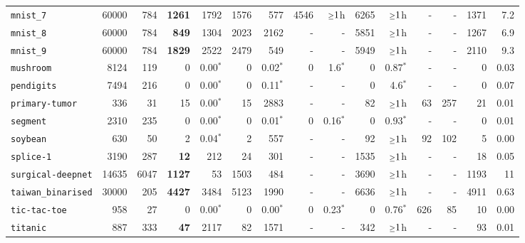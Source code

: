 \begin{tabular}{lccrrrrrrrrrrrr}
\texttt{mnist\_7} & \multicolumn{1}{r}{60000} & \multicolumn{1}{r}{784}  & \textbf{1261} & 1792 & 1576 & 577 & 4546 & $\mathsmaller{\geq}1$h & 6265 & $\mathsmaller{\geq}1$h & - & - & 1371 & 7.2\\
\texttt{mnist\_8} & \multicolumn{1}{r}{60000} & \multicolumn{1}{r}{784}  & \textbf{849} & 1304 & 2023 & 2162 & - & - & 5851 & $\mathsmaller{\geq}1$h & - & - & 1267 & 6.9\\
\texttt{mnist\_9} & \multicolumn{1}{r}{60000} & \multicolumn{1}{r}{784}  & \textbf{1829} & 2522 & 2479 & 549 & - & - & 5949 & $\mathsmaller{\geq}1$h & - & - & 2110 & 9.3\\
\texttt{mushroom} & \multicolumn{1}{r}{8124} & \multicolumn{1}{r}{119}  & 0 & 0.00$^*$ & 0 & 0.02$^*$ & 0 & 1.6$^*$ & 0 & 0.87$^*$ & - & - & 0 & 0.03\\
\texttt{pendigits} & \multicolumn{1}{r}{7494} & \multicolumn{1}{r}{216}  & 0 & 0.00$^*$ & 0 & 0.11$^*$ & - & - & 0 & 4.6$^*$ & - & - & 0 & 0.07\\
\texttt{primary-tumor} & \multicolumn{1}{r}{336} & \multicolumn{1}{r}{31}  & 15 & 0.00$^*$ & 15 & 2883 & - & - & 82 & $\mathsmaller{\geq}1$h & 63 & 257 & 21 & 0.01\\
\texttt{segment} & \multicolumn{1}{r}{2310} & \multicolumn{1}{r}{235}  & 0 & 0.00$^*$ & 0 & 0.01$^*$ & 0 & 0.16$^*$ & 0 & 0.93$^*$ & - & - & 0 & 0.01\\
\texttt{soybean} & \multicolumn{1}{r}{630} & \multicolumn{1}{r}{50}  & 2 & 0.04$^*$ & 2 & 557 & - & - & 92 & $\mathsmaller{\geq}1$h & 92 & 102 & 5 & 0.00\\
\texttt{splice-1} & \multicolumn{1}{r}{3190} & \multicolumn{1}{r}{287}  & \textbf{12} & 212 & 24 & 301 & - & - & 1535 & $\mathsmaller{\geq}1$h & - & - & 18 & 0.05\\
\texttt{surgical-deepnet} & \multicolumn{1}{r}{14635} & \multicolumn{1}{r}{6047}  & \textbf{1127} & 53 & 1503 & 484 & - & - & 3690 & $\mathsmaller{\geq}1$h & - & - & 1193 & 11\\
\texttt{taiwan\_binarised} & \multicolumn{1}{r}{30000} & \multicolumn{1}{r}{205}  & \textbf{4427} & 3484 & 5123 & 1990 & - & - & 6636 & $\mathsmaller{\geq}1$h & - & - & 4911 & 0.63\\
\texttt{tic-tac-toe} & \multicolumn{1}{r}{958} & \multicolumn{1}{r}{27}  & 0 & 0.00$^*$ & 0 & 0.00$^*$ & 0 & 0.23$^*$ & 0 & 0.76$^*$ & 626 & 85 & 10 & 0.00\\
\texttt{titanic} & \multicolumn{1}{r}{887} & \multicolumn{1}{r}{333}  & \textbf{47} & 2117 & 82 & 1571 & - & - & 342 & $\mathsmaller{\geq}1$h & - & - & 93 & 0.01\\

\end{tabular}
